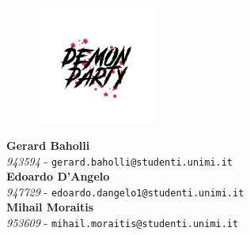 {	\begin{figure}
		\centering
		\includegraphics[width=0.35\textwidth]{images/frontespizio/demonparty_logo.jpg}\\
	\end{figure}

	\vspace*{9mm}

	\textbf{Gerard Baholli}\\
	\textit{943594} - \texttt{gerard.baholli@studenti.unimi.it}\\
	
	\textbf{Edoardo D'Angelo}\\
	\textit{947729} - \texttt{edoardo.dangelo1@studenti.unimi.it}\\
	
	\textbf{Mihail Moraitis}\\
	\textit{953609} - \texttt{mihail.moraitis@studenti.unimi.it}\\

}